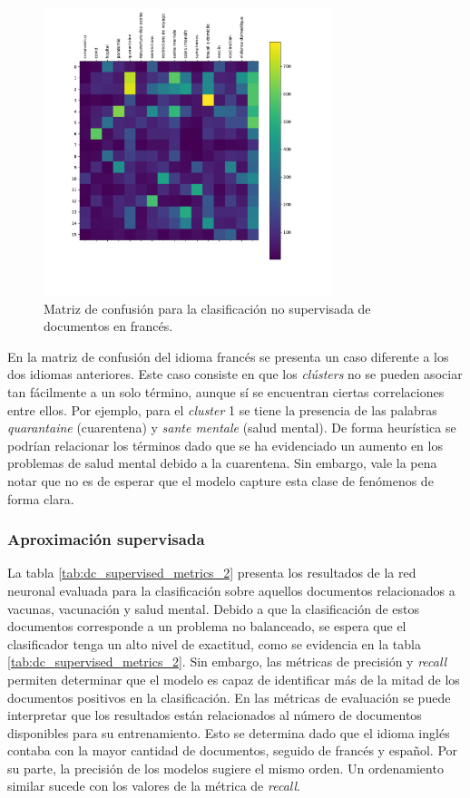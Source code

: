 \begin{figure}[H]
    \centering
    \includegraphics[width=0.75\textwidth]{results/AutomaticIdentification/cf_fr.pdf}
    \caption{Matriz de confusión para la clasificación no supervisada de documentos en francés.}
    \label{fig:dc_cm_fr}
\end{figure}

En la matriz de confusión del idioma francés se presenta un caso diferente a los dos idiomas anteriores. Este caso consiste en que los \textit{clústers} no se pueden asociar tan fácilmente a un solo término, aunque sí se encuentran ciertas correlaciones entre ellos. Por ejemplo, para el \textit{cluster} 1 se tiene la presencia de las palabras \textit{quarantaine} (cuarentena) y \textit{sante mentale} (salud mental). De forma heurística se podrían relacionar los términos dado que se ha evidenciado un aumento en los problemas de salud mental debido a la cuarentena. Sin embargo, vale la pena notar que no es de esperar que el modelo capture esta clase de fenómenos de forma clara. 

\subsubsection{Aproximación supervisada}
La tabla \ref{tab:dc_supervised_metrics_2} presenta los resultados de la red neuronal evaluada para la clasificación sobre aquellos documentos relacionados a vacunas, vacunación y salud mental. Debido a que la clasificación de estos documentos corresponde a un problema no balanceado, se espera que el clasificador tenga un alto nivel de exactitud, como se evidencia en la tabla \ref{tab:dc_supervised_metrics_2}. Sin embargo, las métricas de precisión y \textit{recall} permiten determinar que el modelo es capaz de identificar más de la mitad de los documentos positivos en la clasificación. En las métricas de evaluación se puede interpretar que los resultados están relacionados al número de documentos disponibles para su entrenamiento. Esto se determina dado que el idioma inglés contaba con la mayor cantidad de documentos, seguido de francés y español. Por su parte, la precisión de los modelos sugiere el mismo orden. Un ordenamiento similar sucede con los valores de la métrica de \textit{recall}. 

